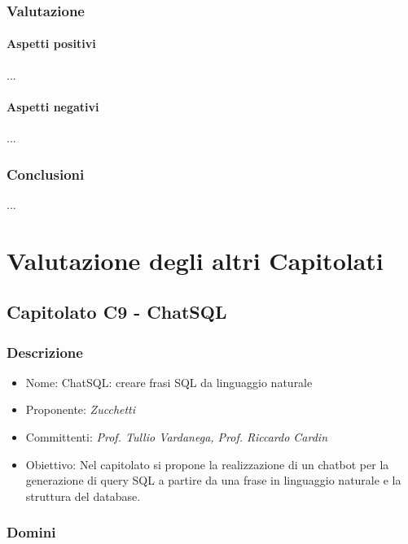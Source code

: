 \documentclass[italian,12pt]{article} %
\begin{document}
\subsubsection{Valutazione}
\paragraph{Aspetti positivi}
...
\paragraph{Aspetti negativi}
...

\subsubsection{Conclusioni}
...



\section{Valutazione degli altri Capitolati}

\subsection{Capitolato C9 - ChatSQL}

\subsubsection{Descrizione}
\begin{itemize}
	\item Nome: ChatSQL: creare frasi SQL da linguaggio naturale
	\item Proponente: {\it Zucchetti}
	\item Committenti: {\it Prof. Tullio Vardanega, Prof. Riccardo Cardin}
	\item Obiettivo: Nel capitolato si propone la realizzazione di un chatbot per la generazione di query SQL a partire da una frase in linguaggio naturale e la struttura del database.
\end{itemize}

\subsubsection{Domini}
\end{document}
